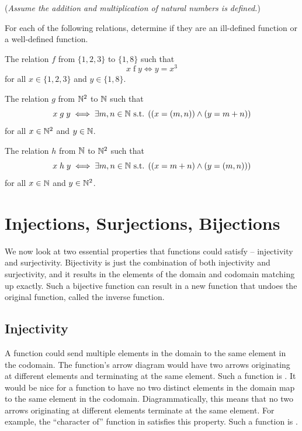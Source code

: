 \begin{exercise}
    \setlength{\parindent}{0pt}
    (\textit{Assume the addition and multiplication of natural numbers is defined.})

    For each of the following relations, determine if they are an ill-defined function or a well-defined function.
    \begin{partquestions}{\alph*}
        \item The relation $f$ from $\{1, 2, 3\}$ to $\{1, 8\}$ such that
        \[
            x \mathrel{f} y \iff y = x^3
        \]
        for all $x \in \{1,2,3\}$ and $y \in \{1,8\}$.
        \item The relation $g$ from $\mathbb{N}^2$ to $\mathbb{N}$ such that
        \[
            x \mathrel{g} y \iff \exists m, n \in \mathbb{N} \text{ s.t. } ((x = (m,n)) \land (y = m + n))
        \]
        for all $x \in \mathbb{N}^2$ and $y \in \mathbb{N}$.
        \item The relation $h$ from $\mathbb{N}$ to $\mathbb{N}^2$ such that
        \[
            x \mathrel{h} y \iff \exists m, n \in \mathbb{N} \text{ s.t. } ((x = m + n) \land (y = (m, n)))
        \]
        for all $x \in \mathbb{N}$ and $y \in \mathbb{N}^2$.
    \end{partquestions}
\end{exercise}

\section{Injections, Surjections, Bijections}
We now look at two essential properties that functions could satisfy -- injectivity and surjectivity. Bijectivity is just the combination of both injectivity and surjectivity, and it results in the elements of the domain and codomain matching up exactly. Such a bijective function can result in a new function that undoes the original function, called the inverse function.

\subsection{Injectivity}
A function could send multiple elements in the domain to the same element in the codomain. The function's arrow diagram would have two arrows originating at different elements and terminating at the same element. Such a function is . It would be nice for a function to have no two distinct elements in the domain map to the same element in the codomain. Diagrammatically, this means that no two arrows originating at different elements terminate at the same element. For example, the ``character of'' function in  satisfies this property. Such a function is .

